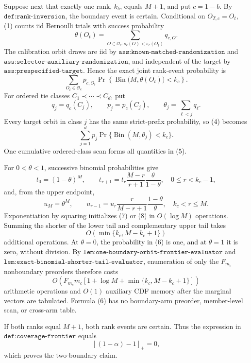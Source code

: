 Suppose next that exactly one rank, \(k_b\), equals \(M+1\), and put \(c=1-b\). By \(\texttt{def:rank-inversion}\), the boundary event is certain. Conditional on \(O_{T,c}=O_t\), (1) counts iid Bernoulli trials with success probability
\[
\theta(O_t)
=
\sum_{O\in\mathcal O_c:s_c(O)<s_c(O_t)}
q_{c,O}.
\tag{3}
\]
The calibration orbit draws are iid by \(\texttt{ass:known-matched-randomization}\) and \(\texttt{ass:selector-auxiliary-randomization}\), and independent of the target by \(\texttt{ass:prespecified-target}\). Hence the exact joint rank-event probability is
\[
\sum_{O_t\in\mathcal O_c}
p_{c,O_t}
\Pr\!\left\{
\operatorname{Bin}\bigl(M,\theta(O_t)\bigr)<k_c
\right\}.
\tag{4}
\]
For ordered tie classes \(C_1\prec\cdots\prec C_d\), put
\[
q_j=q_c(C_j),\qquad
p_j=p_c(C_j),\qquad
\theta_j=\sum_{\ell<j}q_\ell.
\tag{5}
\]
Every target orbit in class \(j\) has the same strict-prefix probability, so (4) becomes
\[
\sum_{j=1}^d
p_j\Pr\{\operatorname{Bin}(M,\theta_j)<k_c\}.
\tag{6}
\]
One cumulative ordered-class scan forms all quantities in (5).

For \(0<\theta<1\), successive binomial probabilities give
\[
t_0=(1-\theta)^M,\qquad
t_{r+1}
=
t_r\frac{M-r}{r+1}\frac{\theta}{1-\theta},
\quad 0\le r<k_c-1,
\tag{7}
\]
and, from the upper endpoint,
\[
u_M=\theta^M,\qquad
u_{r-1}
=
u_r\frac r{M-r+1}\frac{1-\theta}{\theta},
\quad k_c<r\le M.
\tag{8}
\]
Exponentiation by squaring initializes (7) or (8) in \(O(\log M)\) operations. Summing the shorter of the lower tail and complementary upper tail takes
\[
O(\min\{k_c,M-k_c+1\})
\tag{9}
\]
additional operations. At \(\theta=0\), the probability in (6) is one, and at \(\theta=1\) it is zero, without division. By \(\texttt{lem:one-boundary-orbit-frontier-evaluator}\) and \(\texttt{lem:exact-binomial-shorter-tail-evaluator}\), enumeration of only the \(F_{m_c}\) nonboundary preorders therefore costs
\[
O\!\left(
F_{m_c}m_c
[1+\log M+\min\{k_c,M-k_c+1\}]
\right)
\tag{10}
\]
arithmetic operations and \(O(1)\) auxiliary CDF memory after the marginal vectors are tabulated. Formula (6) has no boundary-arm preorder, member-level scan, or cross-arm table.

If both ranks equal \(M+1\), both rank events are certain. Thus the expression in \(\texttt{def:coverage-frontier}\) equals
\[
[(1-\alpha)-1]_+=0,
\tag{11}
\]
which proves the two-boundary claim.

